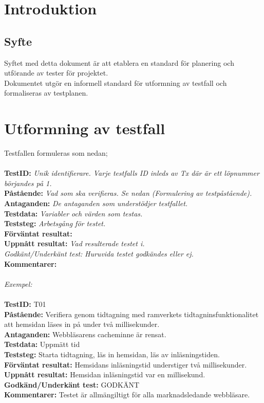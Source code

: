 \section{Introduktion}
\subsection{Syfte}
Syftet med detta dokument är att etablera en standard för planering och utförande av tester för projektet. \\
\medskip
Dokumentet utgör en informell standard för utformning av testfall och formaliseras av testplanen.

\section{Utformning av testfall}
Testfallen formuleras som nedan;
\\
\\
\textbf{TestID:} \textit{Unik identifierare. Varje testfalls ID inleds av Tx där är ett löpnummer börjandes på 1.}\\
\textbf{Påstående:} \textit{Vad som ska verifieras. Se nedan (Formulering av testpåstående).}\\
\textbf{Antaganden:} \textit{De antaganden som understödjer testfallet.}\\
\textbf{Testdata: } \textit{Variabler och värden som testas.}\\
\textbf{Teststeg: } \textit{Arbetsgång för testet.}\\
\textbf{Förväntat resultat: } \\
\textbf{Uppnått resultat: } \textit{Vad resulterade testet i.}\\
\textit{Godkänt/Underkänt test:} \textit{Huruvida testet godkändes eller ej.}\\
\textbf{Kommentarer:} \\
\medskip
\\
\textit{Exempel:}\\
\\
\textbf{TestID:} T01\\
\textbf{Påstående:} Verifiera genom tidtagning med ramverkets tidtagninsfunktionalitet att hemsidan läses in på under två millisekunder. \\
\textbf{Antaganden:} Webbläsarens cacheminne är rensat. \\
\textbf{Testdata:} Uppmätt tid \\
\textbf{Teststeg:} Starta tidtagning, läs in hemsidan, läs av inläsningstiden. \\
\textbf{Förväntat resultat: } Hemsidans inläsningstid understiger två millisekunder. \\
\textbf{Uppnått resultat:} Hemsidan inläsningstid var en millisekund.\\
\textbf{Godkänd/Underkänt test: } GODKÄNT \\
\textbf{Kommentarer:} Testet är allmängiltigt för alla marknadsledande webbläsare. 

